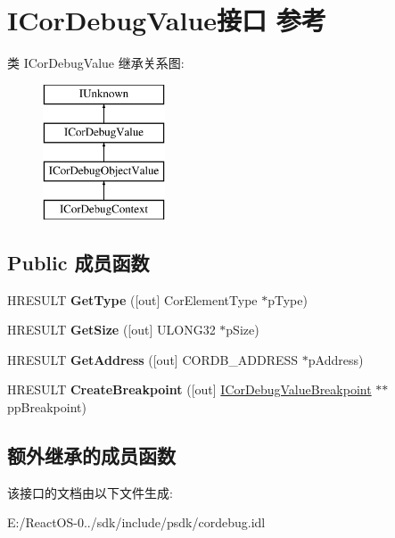 \hypertarget{interface_i_cor_debug_value}{}\section{I\+Cor\+Debug\+Value接口 参考}
\label{interface_i_cor_debug_value}
类 I\+Cor\+Debug\+Value 继承关系图\+:\begin{figure}[H]
\begin{center}
\leavevmode
\includegraphics[height=4.000000cm]{interface_i_cor_debug_value}
\end{center}
\end{figure}
\subsection*{Public 成员函数}
\begin{DoxyCompactItemize}
\item 
\mbox{\label{interface_i_cor_debug_value_a9ded306bb9ffa7bfea8717b4373e05ac}} 
H\+R\+E\+S\+U\+LT {\bfseries Get\+Type} (\mbox{[}out\mbox{]} Cor\+Element\+Type $\ast$p\+Type)
\item 
\mbox{\label{interface_i_cor_debug_value_ad4e24c8b0914dff19d36eef7422c7cd5}} 
H\+R\+E\+S\+U\+LT {\bfseries Get\+Size} (\mbox{[}out\mbox{]} U\+L\+O\+N\+G32 $\ast$p\+Size)
\item 
\mbox{\label{interface_i_cor_debug_value_ac30829513f87a95d1924eaebf71cefe1}} 
H\+R\+E\+S\+U\+LT {\bfseries Get\+Address} (\mbox{[}out\mbox{]} C\+O\+R\+D\+B\+\_\+\+A\+D\+D\+R\+E\+SS $\ast$p\+Address)
\item 
\mbox{\label{interface_i_cor_debug_value_af3c5049426076295771e1933c67f85ad}} 
H\+R\+E\+S\+U\+LT {\bfseries Create\+Breakpoint} (\mbox{[}out\mbox{]} \hyperlink{interface_i_cor_debug_value_breakpoint}{I\+Cor\+Debug\+Value\+Breakpoint} $\ast$$\ast$pp\+Breakpoint)
\end{DoxyCompactItemize}
\subsection*{额外继承的成员函数}


该接口的文档由以下文件生成\+:\begin{DoxyCompactItemize}
\item 
E\+:/\+React\+O\+S-\/0../sdk/include/psdk/cordebug.\+idl\end{DoxyCompactItemize}
